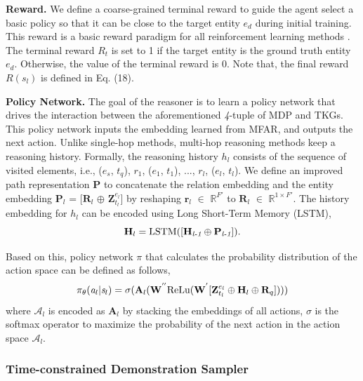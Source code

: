 \documentclass[sigconf,natbib=true]{acmart}
\begin{document}
\textbf{Reward.}  We define a coarse-grained terminal reward to guide the agent select a basic policy so that it can be close to
 the target entity $e_d$ during initial training.  This reward is a basic  reward paradigm for all reinforcement learning methods \cite{rewardRL}. The terminal reward $R_t$ is set to 1 if the target entity is the ground truth entity $e_d$. Otherwise, the value of the terminal reward is 0. Note that, the final reward $R(s_l)$ is defined in Eq. (18).

\textbf{Policy Network.} 
The goal of the reasoner is to learn a policy network that drives the interaction between the aforementioned \emph{4}-tuple of MDP and TKGs. This policy network inputs the embedding learned from MFAR, and outputs the next action. Unlike single-hop methods, multi-hop reasoning methods keep a reasoning history. Formally, the reasoning history $h_l$ consists of the sequence of visited  elements, i.e., ($e_s$, $t_q$), $r_1$,  ($e_1$, $t_1$), ..., $r_l$, ($e_l$, $t_l$). We define an improved path representation $\textbf{P}$ to concatenate the relation embedding and the entity embedding $\textbf{P}_l$ = [$\textbf{R}_l$ $\oplus$ $\textbf{Z}_{t_{l}}^{e_l}$] by reshaping  $\textbf{r}_l$ $\in$ $\mathbb{R}^{F'}$ to $\textbf{R}_l$ $\in$ $\mathbb{R}^{1 \times F'}$. The history embedding for $h_l$ can be encoded using Long Short-Term Memory (LSTM),
\begin{equation}
	\textbf{H}_l= \rm{LSTM}([\textbf{H}_\emph{l-1}\oplus \textbf{P}_\emph{l-1}]).
\end{equation}

Based on this,  policy network $\pi$ that calculates the probability distribution of the action space can be defined as follows,
\begin{equation}
	\pi_\theta(\emph{a}_l|\emph{s}_l) = \sigma(\textbf{A}_{l}(\textbf{W}^{''}\text{ReLu}(\textbf{W}^{'}[\textbf{Z}_{t_{l}}^{e_l}\oplus\textbf{H}_{l}\oplus\textbf{R}_{q}])))
\end{equation}
where $\mathcal{A}_l$ is encoded as $\textbf{A}_{l}$ by stacking the embeddings of all actions, $\sigma$ is the softmax operator to maximize the probability of the next action in the action space $\mathcal{A}_l$.

\subsubsection{Time-constrained Demonstration Sampler}
\end{document}
